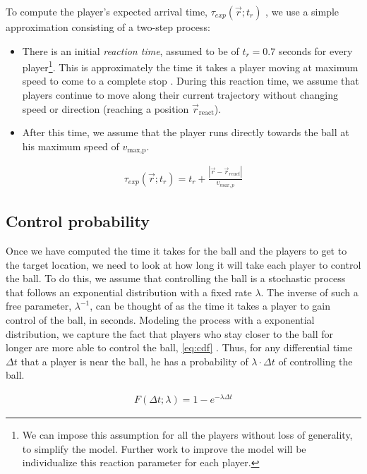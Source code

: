 \documentclass[
  10pt,
  twoside,nohyper]{book}
\providecommand{\tightlist}{%
  \setlength{\itemsep}{0pt}\setlength{\parskip}{0pt}}
\begin{document}
To compute the player's expected arrival time, \(\tau_{exp}(\vec{r};t_r)\) , we use a simple approximation consisting of a two-step process:

\begin{itemize}
\tightlist
\item
  There is an initial \emph{reaction time}, assumed to be of \(t_{r} = 0.7\) seconds for every player\footnote{We can impose this assumption for all the players without loss of generality, to simplify the model. Further work to improve the model will be individualize this reaction parameter for each player.}. This is approximately the time it takes a player moving at maximum speed to come to a complete stop \citep{Spearman}. During this reaction time, we assume that players continue to move along their current trajectory without changing speed or direction (reaching a position \(\vec{r}_{\text{react}}\)).
\item
  After this time, we assume that the player runs directly towards the ball at his maximum speed of \(v_{\text{max,p}}\).
\end{itemize}

\begin{align}
    \tau_{exp}(\vec{r} ; t_r) = t_r + \frac{|\vec{r} - \vec{r}_{react}|}{v_{max,p}}
    \label{exp_arr_time}
\end{align}

\subsection{Control probability}\label{control-probability}

Once we have computed the time it takes for the ball and the players to get to the target location, we need to look at how long it will take each player to control the ball. To do this, we assume that controlling the ball is a stochastic process that follows an exponential distribution with a fixed rate \(\lambda\). The inverse of such a free parameter, \(\lambda^{-1}\), can be thought of as the time it takes a player to gain control of the ball, in seconds. Modeling the process with a exponential distribution, we capture the fact that players who stay closer to the ball for longer are more able to control the ball, \eqref{eq:cdf} \citep{SpearmanFit}. Thus, for any differential time \(\Delta t\) that a player is near the ball, he has a probability of \(\lambda \cdot \Delta t\) of controlling the ball.

\begin{align}
F(\Delta t ; \lambda)=1-e^{-\lambda \Delta t}
\label{eq:cdf}
\end{align}
\end{document}
